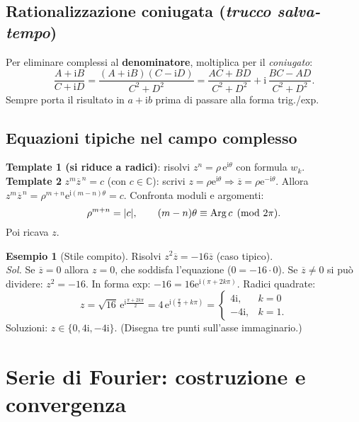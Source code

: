 \documentclass[11pt,a4paper]{article}
\newcommand{\C}{\mathbb{C}}
\newcommand{\e}{\mathrm{e}}
\newcommand{\ii}{\mathrm{i}}
\newcommand{\Arg}{\operatorname{Arg}}
\theoremstyle{definition}
\newtheorem{example}{Esempio}
\begin{document}
\subsection{Rationalizzazione coniugata (\emph{trucco salva-tempo})}
\begin{ideabox}
Per eliminare complessi al \textbf{denominatore}, moltiplica per il \emph{coniugato}:
\[
\frac{A+\ii B}{C+\ii D}
=\frac{(A+\ii B)(C-\ii D)}{C^2+D^2}=\frac{AC+BD}{C^2+D^2}+\ii\,\frac{BC-AD}{C^2+D^2}.
\]
Sempre porta il risultato in $a+\ii b$ prima di passare alla forma trig./exp.
\end{ideabox}

\subsection{Equazioni tipiche nel campo complesso}
\begin{exambox}
\textbf{Template 1 (si riduce a radici)}: risolvi $z^n=\rho\,\e^{\ii\theta}$ con formula $w_k$.\\[0.25em]
\textbf{Template 2} $z^m\overline{z}^{\,n}=c$ (\;con $c\in\C$):
scrivi $z=\rho\e^{\ii\theta}\Rightarrow \overline{z}=\rho\e^{-\ii\theta}$. Allora
$z^m\overline{z}^{\,n}=\rho^{m+n}\e^{\ii(m-n)\theta}=c$.
Confronta moduli e argomenti:
\[
\rho^{m+n}=\abs{c},\qquad (m-n)\theta\equiv \Arg c \pmod{2\pi}.
\]
Poi ricava $z$.
\end{exambox}

\begin{example}[Stile compito]
Risolvi $z^2\overline{z}=-16\overline{z}$ (caso tipico). \\
\emph{Sol.} Se $\overline{z}=0$ allora $z=0$, che soddisfa l'equazione ($0=-16\cdot0$). 
Se $\overline{z}\neq0$ si può dividere: $z^2=-16$. 
In forma exp: $-16=16\e^{\ii(\pi+2k\pi)}$. Radici quadrate:
\[
z=\sqrt{16}\,\e^{\ii\frac{\pi+2k\pi}{2}}=4\,\e^{\ii\left(\frac{\pi}{2}+k\pi\right)}
=\begin{cases}4\ii,&k=0\\ -4\ii,&k=1.\end{cases}
\]
Soluzioni: $z\in\{0,4\ii,-4\ii\}$. (Disegna tre punti sull’asse immaginario.)
\end{example}

\section{Serie di Fourier: costruzione e convergenza}
\end{document}
